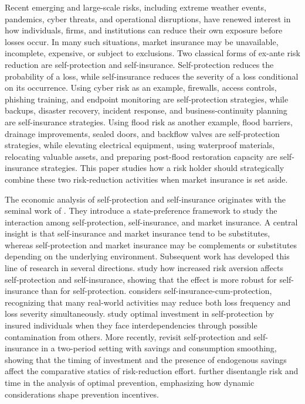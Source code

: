 \documentclass[a4paper,12pt]{article}
\begin{document}
Recent emerging and large-scale risks, including extreme weather events, pandemics, cyber threats, and operational disruptions, have renewed interest in how individuals, firms, and institutions can reduce their own exposure before losses occur. In many such situations, market insurance may be unavailable, incomplete, expensive, or subject to exclusions. Two classical forms of ex-ante risk reduction are self-protection and self-insurance. Self-protection reduces the probability of a loss, while self-insurance reduces the severity of a loss conditional on its occurrence. Using cyber risk as an example, firewalls, access controls, phishing training, and endpoint monitoring are self-protection strategies, while backups, disaster recovery, incident response, and business-continuity planning are self-insurance strategies. Using flood risk as another example, flood barriers, drainage improvements, sealed doors, and backflow valves are self-protection strategies, while elevating electrical equipment, using waterproof materials, relocating valuable assets, and preparing post-flood restoration capacity are self-insurance strategies. This paper studies how a risk holder should strategically combine these two risk-reduction activities when market insurance is set aside.

The economic analysis of self-protection and self-insurance originates with the seminal work of \cite{EhrlichBecker1972}. They introduce a state-preference framework to study the interaction among self-protection, self-insurance, and market insurance. A central insight is that self-insurance and market insurance tend to be substitutes, whereas self-protection and market insurance may be complements or substitutes depending on the underlying environment. Subsequent work has developed this line of research in several directions. \cite{DionneEeckhoudt1985} study how increased risk aversion affects self-protection and self-insurance, showing that the effect is more robust for self-insurance than for self-protection. \cite{Lee1998} considers self-insurance-cum-protection, recognizing that many real-world activities may reduce both loss frequency and loss severity simultaneously. \cite{MuermannKunreuther2008} study optimal investment in self-protection by insured individuals when they face interdependencies through possible contamination from others. More recently, \cite{HofmannPeter2016} revisit self-protection and self-insurance in a two-period setting with savings and consumption smoothing, showing that the timing of investment and the presence of endogenous savings affect the comparative statics of risk-reduction effort. \cite{ChiPeterQi2026} further disentangle risk and time in the analysis of optimal prevention, emphasizing how dynamic considerations shape prevention incentives.
\end{document}
